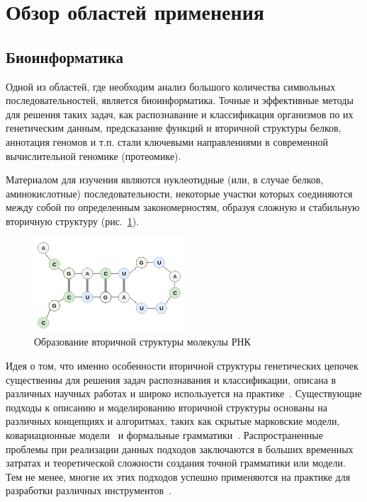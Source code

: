 \section{Обзор областей применения}
\subsection{Биоинформатика}
Одной из областей, где необходим анализ большого количества символьных последовательностей, является биоинформатика. Точные и эффективные методы для решения таких задач, как распознавание и классификация организмов по их генетическим данным, предсказание функций и вторичной структуры белков, аннотация геномов и т.п. стали ключевыми направлениями в современной вычислительной геномике (протеомике).

Материалом для изучения являются нуклеотидные (или, в случае белков, аминокислотные) последовательности, некоторые участки которых соединяются между собой по определенным закономерностям, образуя сложную и стабильную вторичную структуру (рис.~\ref{molekula}).

\begin{figure}[h]
\begin{center}
\centering
\includegraphics[width=0.5\textwidth]{Lunina/pics/molekula.png}
\caption{Образование вторичной структуры молекулы РНК}
\label{molekula}
\end{center}
\end{figure}
Идея о том, что именно особенности вторичной структуры генетических цепочек существенны для решения задач распознавания и классификации, описана в различных научных работах и широко используется на практике~\cite{miladi2017rnascclust, vrehakova2014variation}.
Существующие подходы к описанию и моделированию вторичной структуры основаны на различных концепциях и алгоритмах, таких как скрытые марковские модели, ковариационные модели~\cite{EddyDurbin} и формальные грамматики~\cite{LWPCFG,PCFG,GrammarsRNA}. Распространенные проблемы при реализации данных подходов заключаются в больших временных затратах и теоретической сложности создания точной грамматики или модели. Тем не менее, многие их этих подходов успешно применяются на практике для разработки различных инструментов~\cite{hmmer,infernal}.

